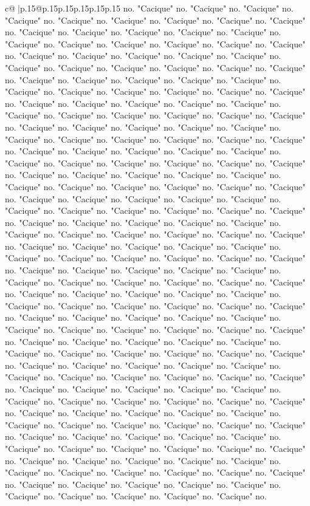 \documentclass{article}
\begin{document}
{\begin{supertabular}{c@{$\;$}|p{.15\linewidth}@{}p{.15\linewidth}p{.15\linewidth}p{.15\linewidth}p{.15\linewidth}p{.15\linewidth}}
{{{no. "Cacique" no. "Cacique" no. "Cacique" no. "Cacique" no. "Cacique" no. "Cacique" no. "Cacique" no. "Cacique" no. "Cacique" no. "Cacique" no. "Cacique" no. "Cacique" no. "Cacique" no. "Cacique" no. "Cacique" no. "Cacique" no. "Cacique" no. "Cacique" no. "Cacique" no. "Cacique" no. "Cacique" no. "Cacique" no. "Cacique" no. "Cacique" no. "Cacique" no. "Cacique" no. "Cacique" no. "Cacique" no. "Cacique" no. "Cacique" no. "Cacique" no. "Cacique" no. "Cacique" no. "Cacique" no. "Cacique" no. "Cacique" no. "Cacique" no. "Cacique" no. "Cacique" no. "Cacique" no. "Cacique" no. "Cacique" no. "Cacique" no. "Cacique" no. "Cacique" no. "Cacique" no. "Cacique" no. "Cacique" no. "Cacique" no. "Cacique" no. "Cacique" no. "Cacique" no. "Cacique" no. "Cacique" no. "Cacique" no. "Cacique" no. "Cacique" no. "Cacique" no. "Cacique" no. "Cacique" no. "Cacique" no. "Cacique" no. "Cacique" no. "Cacique" no. "Cacique" no. "Cacique" no. "Cacique" no. "Cacique" no. "Cacique" no. "Cacique" no. "Cacique" no. "Cacique" no. "Cacique" no. "Cacique" no. "Cacique" no. "Cacique" no. "Cacique" no. "Cacique" no. "Cacique" no. "Cacique" no. "Cacique" no. "Cacique" no. "Cacique" no. "Cacique" no. "Cacique" no. "Cacique" no. "Cacique" no. "Cacique" no. "Cacique" no. "Cacique" no. "Cacique" no. "Cacique" no. "Cacique" no. "Cacique" no. "Cacique" no. "Cacique" no. "Cacique" no. "Cacique" no. "Cacique" no. "Cacique" no. "Cacique" no. "Cacique" no. "Cacique" no. "Cacique" no. "Cacique" no. "Cacique" no. "Cacique" no. "Cacique" no. "Cacique" no. "Cacique" no. "Cacique" no. "Cacique" no. "Cacique" no. "Cacique" no. "Cacique" no. "Cacique" no. "Cacique" no. "Cacique" no. "Cacique" no. "Cacique" no. "Cacique" no. "Cacique" no. "Cacique" no. "Cacique" no. "Cacique" no. "Cacique" no. "Cacique" no. "Cacique" no. "Cacique" no. "Cacique" no. "Cacique" no. "Cacique" no. "Cacique" no. "Cacique" no. "Cacique" no. "Cacique" no. "Cacique" no. "Cacique" no. "Cacique" no. "Cacique" no. "Cacique" no. "Cacique" no. "Cacique" no. "Cacique" no. "Cacique" no. "Cacique" no. "Cacique" no. "Cacique" no. "Cacique" no. "Cacique" no. "Cacique" no. "Cacique" no. "Cacique" no. "Cacique" no. "Cacique" no. "Cacique" no. "Cacique" no. "Cacique" no. "Cacique" no. "Cacique" no. "Cacique" no. "Cacique" no. "Cacique" no. "Cacique" no. "Cacique" no. "Cacique" no. "Cacique" no. "Cacique" no. "Cacique" no. "Cacique" no. "Cacique" no. "Cacique" no. "Cacique" no. "Cacique" no. "Cacique" no. "Cacique" no. "Cacique" no. "Cacique" no. "Cacique" no. "Cacique" no. "Cacique" no. "Cacique" no. "Cacique" no. "Cacique" no. "Cacique" no. "Cacique" no. "Cacique" no. "Cacique" no. "Cacique" no. "Cacique" no. "Cacique" no. "Cacique" no. "Cacique" no. "Cacique" no. "Cacique" no. "Cacique" no. "Cacique" no. "Cacique" no. "Cacique" no. "Cacique" no. "Cacique" no. "Cacique" no. "Cacique" no. "Cacique" no. "Cacique" no. "Cacique" no. "Cacique" no. "Cacique" no. "Cacique" no. "Cacique" no. "Cacique" no. "Cacique" no. "Cacique" no. "Cacique" no. "Cacique" no. "Cacique" no. "Cacique" no. "Cacique" no. "Cacique" no. "Cacique" no. "Cacique" no. "Cacique" no. "Cacique" no. "Cacique" no. "Cacique" no. "Cacique" no. "Cacique" no. "Cacique" no. }}}
\end{supertabular}}
\end{document}
